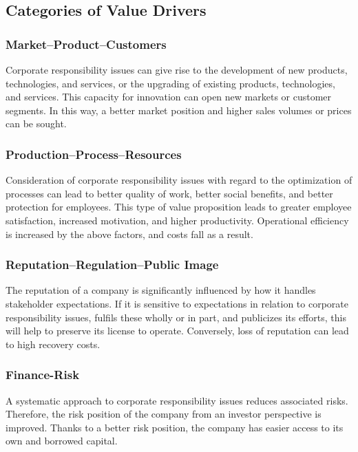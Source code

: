 \documentclass[11pt]{article}
\theoremstyle{definition}
\begin{document}
\subsection{Categories of Value Drivers}
\subsubsection{Market–Product–Customers}
Corporate responsibility issues can give rise to the development of new products, technologies, and services, or the upgrading of existing products, technologies, and services. This capacity for innovation can open new markets or customer segments. In this way, a better market position and higher sales volumes or prices can be sought.

\subsubsection{Production–Process–Resources}
Consideration of corporate responsibility issues with regard to the optimization of processes can lead to better quality of work, better social benefits, and better protection for employees. This type of value proposition leads to greater employee satisfaction, increased motivation, and higher productivity. Operational efficiency is increased by the above factors, and costs fall as a result.

\subsubsection{Reputation–Regulation–Public Image}
The reputation of a company is significantly influenced by how it handles stakeholder expectations. If it is sensitive to expectations in relation to corporate responsibility issues, fulfils these wholly or in part, and publicizes its efforts, this will help to preserve its license to operate. Conversely, loss of reputation can lead to high recovery costs.

\subsubsection{Finance-Risk}
A systematic approach to corporate responsibility issues reduces associated risks. Therefore, the risk position of the company from an investor perspective is improved. Thanks to a better risk position, the company has easier access to its own and borrowed capital.
\end{document}

